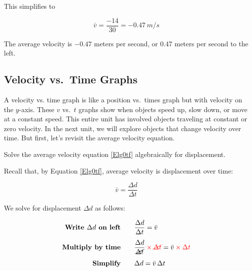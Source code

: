 \documentclass[main.tex]{subfiles}
\begin{document}
This simplifies to

\begin{equation*}
    \bar{v} = \frac{-14}{30} = -\SI{0.47}{m/s}
\end{equation*}

The average velocity is $-0.47$ meters per second, or 0.47 meters per second to the left.


\vspace{1em}

\cyanhrule





\cyanhrule

\subsection{Velocity vs.~Time Graphs} \label{EOqf0D}

A \gls{velocity vs. time graph} is like a position vs.~times graph but with velocity on the $y$-axis. These $v$ vs.~$t$ graphs show when objects speed up, slow down, or move at a constant speed. This entire unit has involved objects traveling at constant or zero velocity. In the next unit, we will explore objects that change velocity over time. But first, let's revisit the average velocity equation.

\begin{example}
    Solve the average velocity equation \eqref{Elg0tf} algebraically for displacement.
\end{example}

\Solution Recall that, by Equation \eqref{Elg0tf}, average velocity is displacement over time:

\begin{equation*}
    \bar{v} = \frac{\Delta{d}}{\Delta{t}}
\end{equation*}

We solve for displacement $\Delta{d}$ as follows:

\begin{align*}
    \textbf{Write $\Delta{d}$ on left} \qquad & \frac{\Delta{d}}{\Delta{t}} = \bar{v}\\[1ex]
    \textbf{Multiply by time} \qquad & \frac{\Delta{d}}{\cancel{\Delta{t}}} \mathbin{\color{red} \times} \textcolor{red}{\cancel{\Delta{t}}} = \bar{v} \mathbin{\color{red} \times} \textcolor{red}{\Delta{t}}\\[1ex]
    \textbf{Simplify} \qquad & \Delta{d} = \bar{v}\,\Delta{t}
\end{align*}
\end{document}
